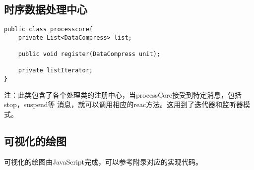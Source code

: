 \subsection{时序数据处理中心}
\begin{lstlisting}
public class processcore{
	private List<DataCompress> list;

	public void register(DataCompress unit);

	private listIterator;
}
\end{lstlisting}

注：此类包含了各个处理类的注册中心，当processCore接受到特定消息，包括stop，suspend等
消息，就可以调用相应的reac方法。这用到了迭代器和监听器模式。

\subsection{可视化的绘图}
可视化的绘图由JavaScript完成，可以参考附录对应的实现代码。
























